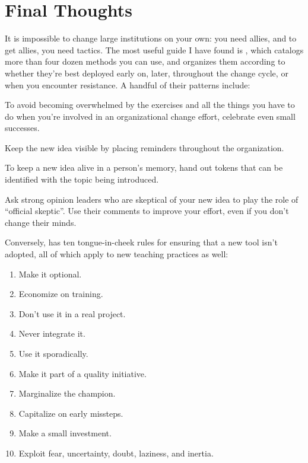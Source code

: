 \section{Final Thoughts}\label{s:partner-final}

It is impossible to change large institutions on your own: you need
allies, and to get allies, you need tactics. The most useful guide I
have found is \cite{Mann2015}, which catalogs more than four dozen
methods you can use, and organizes them according to whether they're
best deployed early on, later, throughout the change cycle, or when you
encounter resistance. A handful of their patterns include:

\begin{description}
\tightlist
\item[Small Successes:]
To avoid becoming overwhelmed by the exercises and all the things
you have to do when you're involved in an organizational change
effort, celebrate even small successes.
\item[In Your Space:]
Keep the new idea visible by placing reminders throughout the
organization.
\item[Token:]
To keep a new idea alive in a person's memory, hand out tokens that
can be identified with the topic being introduced.
\item[Champion Skeptic:]
Ask strong opinion leaders who are skeptical of your new idea to
play the role of ``official skeptic''. Use their comments to improve
your effort, even if you don't change their minds.
\end{description}

Conversely, \cite{Farm2006} has ten tongue-in-cheek rules for
ensuring that a new tool isn't adopted, all of which apply to new
teaching practices as well:

\begin{enumerate}
\item
  Make it optional.
\item
  Economize on training.
\item
  Don't use it in a real project.
\item
  Never integrate it.
\item
  Use it sporadically.
\item
  Make it part of a quality initiative.
\item
  Marginalize the champion.
\item
  Capitalize on early missteps.
\item
  Make a small investment.
\item
  Exploit fear, uncertainty, doubt, laziness, and inertia.
\end{enumerate}

